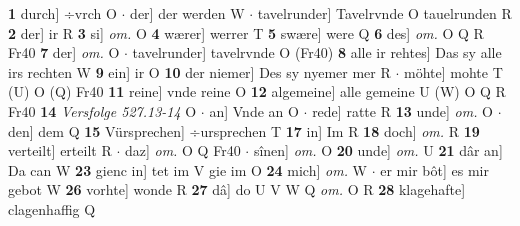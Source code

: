 \documentclass[8pt,a4paper,notitlepage]{article}
\begin{document}
\begin{table}[ht]
\begin{minipage}[t]{0.5\linewidth}
\textbf{1} durch] ÷vrch O  $\cdot$ der] der werden W  $\cdot$ tavelrunder] Tavelrvnde O tauelrunden R \textbf{2} der] ir R \textbf{3} si] \textit{om.} O \textbf{4} wærer] werrer T \textbf{5} swære] were Q \textbf{6} des] \textit{om.} O Q R Fr40 \textbf{7} der] \textit{om.} O  $\cdot$ tavelrunder] tavelrvnde O (Fr40) \textbf{8} alle ir rehtes] Das sy alle irs rechten W \textbf{9} ein] ir O \textbf{10} der niemer] Des sy nyemer mer R  $\cdot$ möhte] mohte T (U) O (Q) Fr40 \textbf{11} reine] vnde reine O \textbf{12} algemeine] alle gemeine U (W) O Q R Fr40 \textbf{14} \textit{Versfolge 527.13-14} O   $\cdot$ an] Vnde an O  $\cdot$ rede] ratte R \textbf{13} unde] \textit{om.} O  $\cdot$ den] dem Q \textbf{15} Vürsprechen] ÷ursprechen T \textbf{17} in] Im R \textbf{18} doch] \textit{om.} R \textbf{19} verteilt] erteilt R  $\cdot$ daz] \textit{om.} O Q Fr40  $\cdot$ sînen] \textit{om.} O \textbf{20} unde] \textit{om.} U \textbf{21} dâr an] Da can W \textbf{23} gienc in] tet im V gie im O \textbf{24} mich] \textit{om.} W  $\cdot$ er mir bôt] es mir gebot W \textbf{26} vorhte] wonde R \textbf{27} dâ] do U V W Q \textit{om.} O R \textbf{28} klagehafte] clagenhaffig Q \newline
\end{minipage}
\end{table}
\end{document}
